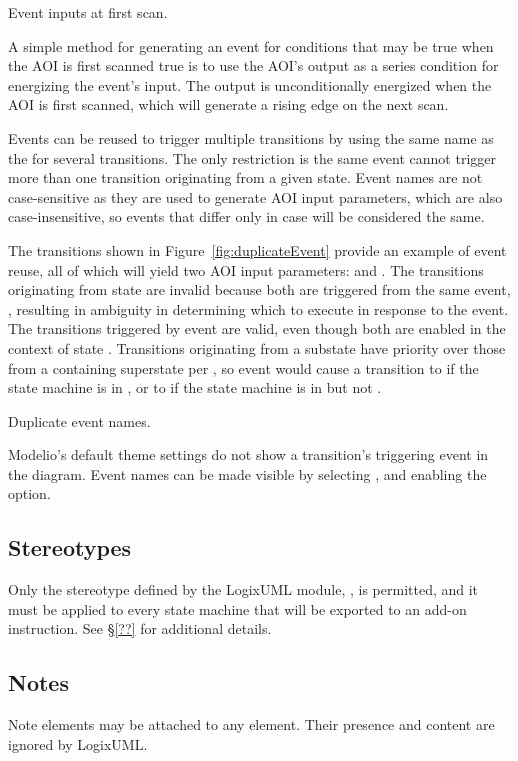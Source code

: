                {Event inputs at first scan.}

A simple method for generating an event for conditions that may be
true when the AOI is first scanned true is to use the AOI's
 output as a series condition for energizing the
event's input. The  output is unconditionally energized
when the AOI is first scanned, which will generate a rising edge on the
next scan.

Events can be reused to trigger multiple transitions by using the
same name as the  for several transitions.
The only restriction is the same event cannot trigger more than
one transition originating from a given state.
Event names are not case-sensitive as they are used to generate AOI input
parameters, which are also case-insensitive, so events that differ only in
case will be considered the same.

The transitions shown in Figure~\ref{fig:duplicateEvent} provide an example
of event reuse, all of which will yield two AOI input parameters:
 and .
The transitions originating from state  are invalid because
both are triggered from the same event, ,
resulting in ambiguity in determining which to execute in response to the event.
The transitions triggered by event  are valid, even though both
are enabled in the context of state .
Transitions originating from a substate have priority over those
from a containing superstate per \textcite[\S14.2.3.9.4]{OMGUML}, so
event  would cause a transition to  if the
state machine is in , or to  if the state
machine is in  but not .

               {Duplicate event names.}

Modelio's default theme settings do not show a transition's triggering
event in the diagram. Event names can be made visible by selecting
, and enabling the
 option.


\subsection{Stereotypes}

Only the stereotype defined by the LogixUML module,
, is permitted, and it must be applied to
every state machine that will be exported to an add-on instruction.
See \S\ref{??} for additional details.


\subsection{Notes}

Note elements may be attached to any element. Their presence and content
are ignored by LogixUML.
